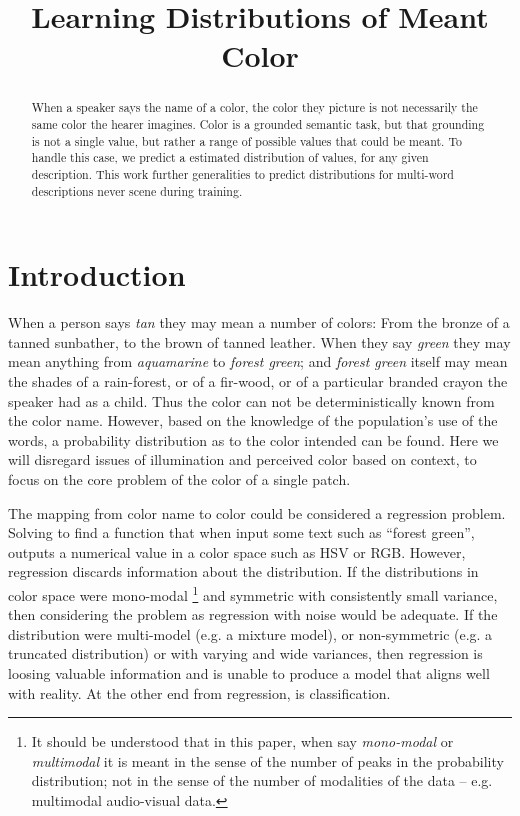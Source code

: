 \documentclass[11pt,letterpaper]{article}
\title{Learning Distributions of Meant Color}
\author{}
\date{}
\begin{document}
\maketitle

\begin{abstract}
When a speaker says the name of a color, the color they picture is not necessarily the same color the hearer imagines.
Color is a grounded semantic task, but that grounding is not a single value, but rather a range of possible values that could be meant.
To handle this case, we predict a estimated distribution of values, for any given description.
This work further generalities to predict distributions for multi-word descriptions never scene during training.

\end{abstract}

\section{Introduction}
When a person says \emph{tan} they may mean a number of colors: From the bronze of a tanned sunbather, to the brown of tanned leather. When they say \emph{green} they may mean anything from \emph{aquamarine} to \emph{forest green}; and \emph{forest green} itself may mean the shades of a rain-forest, or of a fir-wood, or of a particular branded crayon the speaker had as a child.
Thus the color can not be deterministically known from the color name.
However, based on the knowledge of the population's use of the words, a probability distribution as to the color intended can be found.
Here we will disregard issues of illumination and perceived color based on context, to focus on the core problem of the color of a single patch.


The mapping from color name to color could be considered a regression problem. Solving to find a function that when input some text such as ``forest green'', outputs a numerical value in a color space such as HSV or RGB.
However, regression discards information about the distribution.
If the distributions in color space were mono-modal
\footnote{It should be understood that in this paper, when say \emph{mono-modal} or \emph{multimodal} it is meant in the sense of the number of peaks in the probability distribution; not in the sense of the number of modalities of the data -- e.g. multimodal audio-visual data.}
 and symmetric with consistently small variance, then considering the problem as regression with noise would be adequate.
If the distribution were multi-model (e.g. a mixture model), or non-symmetric (e.g. a truncated distribution) or with varying and wide variances, then regression is loosing valuable information and is unable to produce a model that aligns well with reality.
At the other end from regression, is classification.
\end{document}
